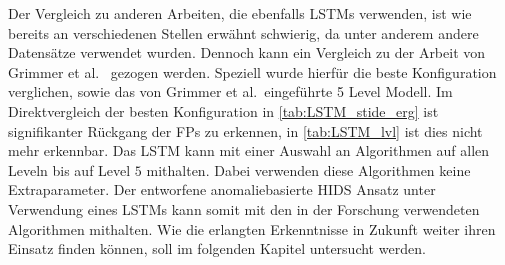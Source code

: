 Der Vergleich zu anderen Arbeiten, die ebenfalls \acp{LSTM} verwenden, ist wie bereits an verschiedenen Stellen erwähnt schwierig, da unter anderem andere Datensätze verwendet wurden.
Dennoch kann ein Vergleich zu der Arbeit von Grimmer et al.~\cite{IDSTHREADGRIMMER2021} gezogen werden.
Speziell wurde hierfür die beste Konfiguration verglichen, sowie das von Grimmer et al.\ eingeführte 5 Level Modell.
Im Direktvergleich der besten Konfiguration in \autoref{tab:LSTM_stide_erg} ist signifikanter Rückgang der \acp{FP} zu erkennen, in \autoref{tab:LSTM_lvl} ist dies nicht mehr erkennbar.
Das \ac{LSTM} kann mit einer Auswahl an Algorithmen auf allen Leveln bis auf Level $5$ mithalten.
Dabei verwenden diese Algorithmen keine Extraparameter.
Der entworfene anomaliebasierte \ac{HIDS} Ansatz unter Verwendung eines \acp{LSTM} kann somit mit den in der Forschung verwendeten Algorithmen mithalten.
Wie die erlangten Erkenntnisse in Zukunft weiter ihren Einsatz finden können, soll im folgenden Kapitel untersucht werden.
